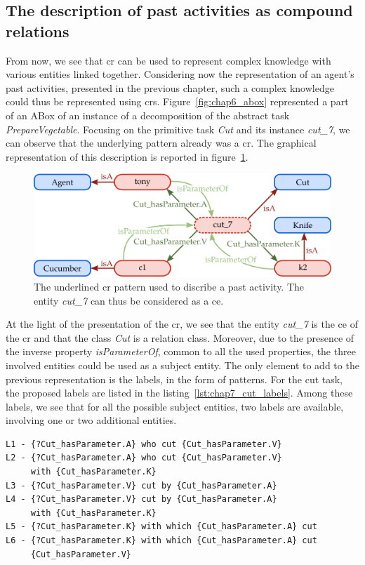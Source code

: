 \subsection{The description of past activities as compound relations}

From now, we see that \acrlong{cr} can be used to represent complex knowledge with various entities linked together. Considering now the representation of an agent's past activities, presented in the previous chapter, such a complex knowledge could thus be represented using \acrshort{cr}s. Figure~\ref{fig:chap6_abox} represented a part of an ABox of an instance of a decomposition of the abstract task \textit{PrepareVegetable}. Focusing on the primitive task \textit{Cut} and its instance \textit{cut\_7}, we can observe that the underlying pattern already was a \acrshort{cr}. The graphical representation of this description is reported in figure~\ref{fig:chap7_cut7}.

\begin{figure}[ht!]
\centering
\includegraphics[scale=0.4]{figures/chapter7/cut7.png}
\caption{\label{fig:chap7_cut7} The underlined \acrlong{cr} pattern used to discribe a past activity. The entity \textit{cut\_7} can thus be considered as a \acrlong{ce}. }
\end{figure}

At the light of the presentation of the \acrshort{cr}, we see that the entity \textit{cut\_7} is the \acrlong{ce} of the \acrlong{cr} and that the class \textit{Cut} is a relation class. Moreover, due to the presence of the inverse property \textit{isParameterOf}, common to all the used properties, the three involved entities could be used as a subject entity. The only element to add to the previous representation is the labels, in the form of patterns. For the cut task, the proposed labels are listed in the listing~\ref{lst:chap7_cut_labels}. Among these labels, we see that for all the possible subject entities, two labels are available, involving one or two additional entities.

\begin{lstlisting}[frame=single, caption={ The set of labels usable to discribe the compound relation representing an instance of a cut primitive task.}, label={lst:chap7_cut_labels}, captionpos=b, style=Labels, mathescape=true]
L1 - {?Cut_hasParameter.A} who cut {Cut_hasParameter.V}
L2 - {?Cut_hasParameter.A} who cut {Cut_hasParameter.V} 
     with {Cut_hasParameter.K}
L3 - {?Cut_hasParameter.V} cut by {Cut_hasParameter.A}
L4 - {?Cut_hasParameter.V} cut by {Cut_hasParameter.A} 
     with {Cut_hasParameter.K}
L5 - {?Cut_hasParameter.K} with which {Cut_hasParameter.A} cut
L6 - {?Cut_hasParameter.K} with which {Cut_hasParameter.A} cut 
     {Cut_hasParameter.V}
\end{lstlisting}

